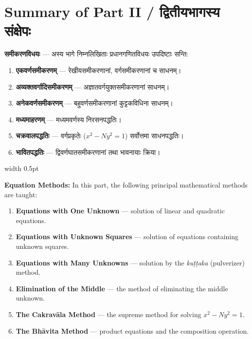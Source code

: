 \documentclass[11pt,a4paper]{article}
\newcommand{\vs}{\vspace{0.5em}}
\newcommand{\bilingual}[2]{%
  \par\vspace{0.5em}%
  \noindent\begin{minipage}[t]{0.47\textwidth}%
  \setlength{\parindent}{0pt}%
  \small #1%
  \end{minipage}%
  \hfill\textcolor{columnrule}{\vrule width 0.5pt}\hfill%
  \begin{minipage}[t]{0.47\textwidth}%
  \setlength{\parindent}{0pt}%
  \small\raggedright #2%
  \end{minipage}%
  \par\vspace{0.5em}%
}
\begin{document}
\section*{Summary of Part II / द्वितीयभागस्य संक्षेपः}

\bilingual{\textbf{समीकरणविधयः} — अस्य भागे निम्नलिखिताः प्रधानगणितविधयः उपदिष्टाः सन्ति:

\begin{enumerate}
\item \textbf{एकवर्णसमीकरणम्} — रेखीयसमीकरणानां, वर्गसमीकरणानां च साधनम्।
\item \textbf{अव्यक्तवर्गादिसमीकरणम्} — अज्ञातवर्गयुक्तसमीकरणानां साधनम्।
\item \textbf{अनेकवर्णसमीकरणम्} — बहुवर्णसमीकरणानां कुट्टकविधिना साधनम्।
\item \textbf{मध्यमाहरणम्} — मध्यमवर्णस्य निरसनपद्धतिः।
\item \textbf{चक्रवालपद्धतिः} — वर्गप्रकृतेः ($x^2 - Ny^2 = 1$) सर्वोत्तमा साधनपद्धतिः।
\item \textbf{भावितपद्धतिः} — द्विवर्णघातसमीकरणानां तथा भावनायाः क्रिया।
\end{enumerate}
}{%
\textbf{Equation Methods:} In this part, the following principal mathematical methods are taught:

\begin{enumerate}
\item \textbf{Equations with One Unknown} --- solution of linear and quadratic equations.
\item \textbf{Equations with Unknown Squares} --- solution of equations containing unknown squares.
\item \textbf{Equations with Many Unknowns} --- solution by the \textit{ku\d{t}\d{t}aka} (pulverizer) method.
\item \textbf{Elimination of the Middle} --- the method of eliminating the middle unknown.
\item \textbf{The Cakrav\={a}la Method} --- the supreme method for solving $x^2 - Ny^2 = 1$.
\item \textbf{The Bh\={a}vita Method} --- product equations and the composition operation.
\end{enumerate}}

\vs
\end{document}
